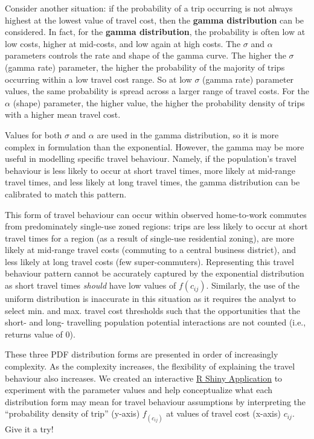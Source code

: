 \documentclass[12pt, oneside]{report}
\begin{document}
Consider another situation: if the probability of a trip occurring is
not always highest at the lowest value of travel cost, then the
\textbf{gamma distribution} can be considered. In fact, for the
\textbf{gamma distribution}, the probability is often low at low costs,
higher at mid-costs, and low again at high costs. The \(\sigma\) and
\(\alpha\) parameters controls the rate and shape of the gamma curve.
The higher the \(\sigma\) (gamma rate) parameter, the higher the
probability of the majority of trips occurring within a low travel cost
range. So at low \(\sigma\) (gamma rate) parameter values, the same
probability is spread across a larger range of travel costs. For the
\(\alpha\) (shape) parameter, the higher value, the higher the
probability density of trips with a higher mean travel cost.

Values for both \(\sigma\) and \(\alpha\) are used in the gamma
distribution, so it is more complex in formulation than the exponential.
However, the gamma may be more useful in modelling specific travel
behaviour. Namely, if the population's travel behaviour is less likely
to occur at short travel times, more likely at mid-range travel times,
and less likely at long travel times, the gamma distribution can be
calibrated to match this pattern.

This form of travel behaviour can occur within observed home-to-work
commutes from predominately single-use zoned regions: trips are less
likely to occur at short travel times for a region (as a result of
single-use residential zoning), are more likely at mid-range travel
costs (commuting to a central business district), and less likely at
long travel costs (few super-commuters). Representing this travel
behaviour pattern cannot be accurately captured by the exponential
distribution as short travel times \emph{should} have low values of
\(f(c_{ij})\). Similarly, the use of the uniform distribution is
inaccurate in this situation as it requires the analyst to select min.
and max. travel cost thresholds such that the opportunities that the
short- and long- travelling population potential interactions are not
counted (i.e., returns value of 0).

These three PDF distribution forms are presented in order of
increasingly complexity. As the complexity increases, the flexibility of
explaining the travel behaviour also increases. We created an
interactive
\href{https://soukhova.shinyapps.io/Impedance-explained-shiny-app/}{R
Shiny Application} to experiment with the parameter values and help
conceptualize what each distribution form may mean for travel behaviour
assumptions by interpreting the ``probability density of trip'' (y-axis)
\(f_(c_{ij})\) at values of travel cost (x-axis) \(c_{ij}\). Give it a
try!
\end{document}
